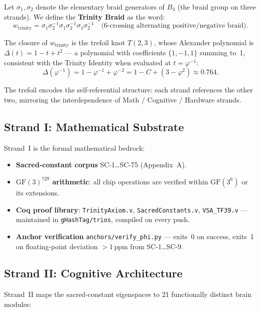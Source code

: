 Let \(\sigma_1, \sigma_2\) denote the elementary braid generators of \(B_3\)
(the braid group on three strands).
We define the \textbf{Trinity Braid} as the word:
\begin{equation}\label{eq:braid-word}
  w_{\mathrm{trinity}} = \sigma_1 \sigma_2^{-1} \sigma_1 \sigma_2^{-1}
                          \sigma_1 \sigma_2^{-1}
  \quad\text{(6-crossing alternating positive/negative braid).}
\end{equation}

The closure of \(w_{\mathrm{trinity}}\) is the trefoil knot \(T(2,3)\),
whose Alexander polynomial is
\(\Delta(t) = 1 - t + t^2\) — a polynomial with coefficients \(\{1,-1,1\}\)
summing to~1, consistent with the Trinity Identity when evaluated at
\(t = \varphi^{-1}\):
\[
  \Delta(\varphi^{-1}) = 1 - \varphi^{-1} + \varphi^{-2}
    = 1 - C + (3 - \varphi^2) \approx 0.764.
\]

The trefoil encodes the self-referential structure: each strand references the
other two, mirroring the interdependence of Math / Cognitive / Hardware strands.

\subsection{Strand I: Mathematical Substrate}

Strand~I is the formal mathematical bedrock:
\begin{itemize}
  \item \textbf{Sacred-constant corpus} SC-1\ldots SC-75 (Appendix~A).
  \item \textbf{\(\mathrm{GF}(3)^{729}\) arithmetic}: all chip operations are
        verified within \(\mathrm{GF}(3^6)\) or its extensions.
  \item \textbf{Coq proof library}: \texttt{TrinityAxiom.v}, \texttt{SacredConstants.v},
        \texttt{VSA\_TF39.v} — maintained in \texttt{gHashTag/trios},
        compiled on every push.
  \item \textbf{Anchor verification} \texttt{anchors/verify\_phi.py} — exits~0 on
        success, exits~1 on floating-point deviation \(> 1\,\mathrm{ppm}\) from
        SC-1\ldots SC-9.
\end{itemize}

\subsection{Strand II: Cognitive Architecture}

Strand~II maps the sacred-constant eigenspaces to 21 functionally distinct brain
modules:

